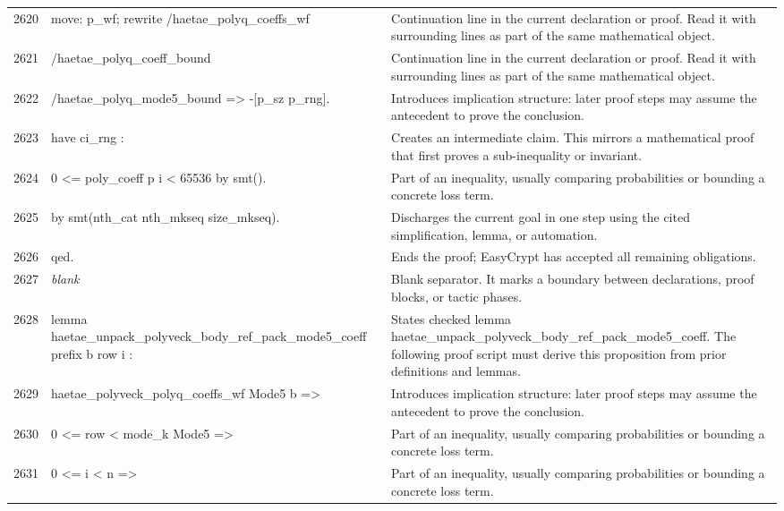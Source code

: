 \documentclass[10pt]{article}
\begin{document}
\begin{longtable}{r L{0.53\textwidth} L{0.37\textwidth}}
2620 & {\ttfamily\scriptsize move: p\_wf; rewrite /haetae\_polyq\_coeffs\_wf} & Continuation line in the current declaration or proof.  Read it with surrounding lines as part of the same mathematical object. \\
2621 & {\ttfamily\scriptsize                   /haetae\_polyq\_coeff\_bound} & Continuation line in the current declaration or proof.  Read it with surrounding lines as part of the same mathematical object. \\
2622 & {\ttfamily\scriptsize                   /haetae\_polyq\_mode5\_bound => -[p\_sz p\_rng].} & Introduces implication structure: later proof steps may assume the antecedent to prove the conclusion. \\
2623 & {\ttfamily\scriptsize have ci\_rng :} & Creates an intermediate claim.  This mirrors a mathematical proof that first proves a sub-inequality or invariant. \\
2624 & {\ttfamily\scriptsize   0 <= poly\_coeff p i < 65536 by smt().} & Part of an inequality, usually comparing probabilities or bounding a concrete loss term. \\
2625 & {\ttfamily\scriptsize by smt(nth\_cat nth\_mkseq size\_mkseq).} & Discharges the current goal in one step using the cited simplification, lemma, or automation. \\
2626 & {\ttfamily\scriptsize qed.} & Ends the proof; EasyCrypt has accepted all remaining obligations. \\
2627 & {\ttfamily\scriptsize \emph{blank}} & Blank separator.  It marks a boundary between declarations, proof blocks, or tactic phases. \\
2628 & {\ttfamily\scriptsize lemma haetae\_unpack\_polyveck\_body\_ref\_pack\_mode5\_coeff prefix b row i :} & States checked lemma haetae\_unpack\_polyveck\_body\_ref\_pack\_mode5\_coeff.  The following proof script must derive this proposition from prior definitions and lemmas. \\
2629 & {\ttfamily\scriptsize   haetae\_polyveck\_polyq\_coeffs\_wf Mode5 b =>} & Introduces implication structure: later proof steps may assume the antecedent to prove the conclusion. \\
2630 & {\ttfamily\scriptsize   0 <= row < mode\_k Mode5 =>} & Part of an inequality, usually comparing probabilities or bounding a concrete loss term. \\
2631 & {\ttfamily\scriptsize   0 <= i < n =>} & Part of an inequality, usually comparing probabilities or bounding a concrete loss term. \\

\end{longtable}
\end{document}
